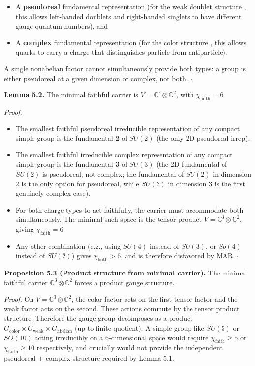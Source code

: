 \begin{itemize}
\tightlist
\item
  A \textbf{pseudoreal} fundamental representation (for the weak doublet structure , this allows left-handed doublets and right-handed singlets to have different gauge quantum numbers), and
\item
  A \textbf{complex} fundamental representation (for the color structure , this allows quarks to carry a charge that distinguishes particle from antiparticle).
\end{itemize}

A single nonabelian factor cannot simultaneously provide both types: a group is either pseudoreal at a given dimension or complex, not both. \(\square\)

\textbf{Lemma 5.2.} The minimal faithful carrier is \(V = \mathbb{C}^3 \otimes \mathbb{C}^2\), with \(\chi_{\mathrm{faith}} = 6\).

\emph{Proof.}

\begin{itemize}
\tightlist
\item
  The smallest faithful pseudoreal irreducible representation of any compact simple group is the fundamental \textbf{2} of \(SU(2)\) (the only 2D pseudoreal irrep).
\item
  The smallest faithful irreducible complex representation of any compact simple group is the fundamental \textbf{3} of \(SU(3)\) (the 2D fundamental of \(SU(2)\) is pseudoreal, not complex; the fundamental of \(SU(2)\) in dimension 2 is the only option for pseudoreal, while \(SU(3)\) in dimension 3 is the first genuinely complex case).
\item
  For both charge types to act faithfully, the carrier must accommodate both simultaneously. The minimal such space is the tensor product \(V = \mathbb{C}^3 \otimes \mathbb{C}^2\), giving \(\chi_{\mathrm{faith}} = 6\).
\item
  Any other combination (e.g., using \(SU(4)\) instead of \(SU(3)\), or \(Sp(4)\) instead of \(SU(2)\)) gives \(\chi_{\mathrm{faith}} > 6\), and is therefore disfavored by MAR. \(\square\)
\end{itemize}

\textbf{Proposition 5.3 (Product structure from minimal carrier).} The minimal faithful carrier \(\mathbb{C}^3 \otimes \mathbb{C}^2\) forces a product gauge structure.

\emph{Proof.} On \(V = \mathbb{C}^3 \otimes \mathbb{C}^2\), the color factor acts on the first tensor factor and the weak factor acts on the second. These actions commute by the tensor product structure. Therefore the gauge group decomposes as a product \(G_{\mathrm{color}} \times G_{\mathrm{weak}} \times G_{\mathrm{abelian}}\) (up to finite quotient). A simple group like \(SU(5)\) or \(SO(10)\) acting irreducibly on a 6-dimensional space would require \(\chi_{\mathrm{faith}} \geq 5\) or \(\chi_{\mathrm{faith}} \geq 10\) respectively, and crucially would not provide the independent pseudoreal + complex structure required by Lemma 5.1.

